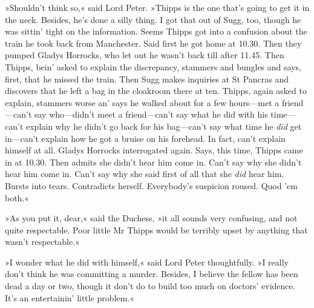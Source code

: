 »Shouldn't think so,« said Lord Peter. »Thipps is the one that's going to get it in the neck. Besides, he's done a silly thing. I got that out of Sugg, too, though he was sittin' tight on the information. Seems Thipps got into a confusion about the train he took back from Manchester. Said first he got home at 10.30. Then they pumped Gladys Horrocks, who let out he wasn't back till after 11.45. Then Thipps, bein' asked to explain the discrepancy, stammers and bungles and says, first, that he missed the train. Then Sugg makes inquiries at St Pancras and discovers that he left a bag in the cloakroom there at ten. Thipps, again asked to explain, stammers worse an' says he walked about for a few hours\allowbreak---\allowbreak met a friend\allowbreak---\allowbreak can't say who\allowbreak---\allowbreak didn't meet a friend\allowbreak---\allowbreak can't say what he did with his time\allowbreak---\allowbreak can't explain why he didn't go back for his bag\allowbreak---\allowbreak can't say what time he \textit{did} get in\allowbreak---\allowbreak can't explain how he got a bruise on his forehead. In fact, can't explain himself at all. Gladys Horrocks interrogated again. Says, this time, Thipps came in at 10.30. Then admits she didn't hear him come in. Can't say why she didn't hear him come in. Can't say why she said first of all that she \textit{did} hear him. Bursts into tears. Contradicts herself. Everybody's suspicion roused. Quod 'em both.«

»As you put it, dear,« said the Duchess, »it all sounds very confusing, and not quite respectable. Poor little Mr Thipps would be terribly upset by anything that wasn't respectable.«

»I wonder what he did with himself,« said Lord Peter thoughtfully. »I really don't think he was committing a murder. Besides, I believe the fellow has been dead a day or two, though it don't do to build too much on doctors' evidence. It's an entertainin' little problem.«

